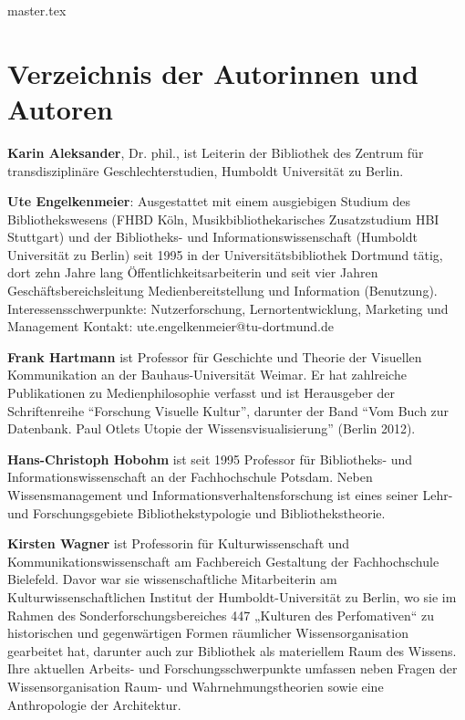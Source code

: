 \documentclass[10.5pt,a5paper,twoside]{memoir}
\begin{document}
\vspace{5mm}

{master.tex}


\chapter*[Verzeichnis der Autorinnen und Autoren]{Verzeichnis der Autorinnen und Autoren}

\noindent \textbf{Karin Aleksander}, Dr. phil., ist Leiterin der Bibliothek des Zentrum für transdisziplinäre Geschlechterstudien, Humboldt Universität zu Berlin.

\vspace{5mm}

\noindent \textbf{Ute Engelkenmeier}: Ausgestattet mit einem ausgiebigen Studium des
Bibliothekswesens (FHBD Köln, Musikbibliothekarisches Zusatzstudium HBI
Stuttgart) und der Bibliotheks- und Informationswissenschaft (Humboldt
Universität zu Berlin) seit 1995 in der Universitätsbibliothek Dortmund
tätig, dort zehn Jahre lang Öffentlichkeitsarbeiterin und seit vier
Jahren Geschäftsbereichsleitung Medienbereitstellung und Information
(Benutzung).
Interessensschwerpunkte: Nutzerforschung, Lernortentwicklung, Marketing
und Management
Kontakt: ute.engelkenmeier@tu-dortmund.de

\vspace{5mm}

\noindent \textbf{Frank Hartmann} ist Professor für Geschichte und Theorie der Visuellen Kommunikation an der Bauhaus-Universität Weimar. Er hat zahlreiche Publikationen zu Medienphilosophie verfasst und ist Herausgeber der Schriftenreihe \enquote{Forschung Visuelle Kultur}, darunter der Band \enquote{Vom Buch zur Datenbank. Paul Otlets Utopie der Wissensvisualisierung} (Berlin 2012).

\vspace{5mm}

\noindent \textbf{Hans-Christoph Hobohm} ist seit 1995 Professor für Biblio\-theks- und Informationswissenschaft an der Fachhochschule Potsdam. Neben Wissensmanagement und Informationsverhaltensforschung ist eines seiner Lehr- und Forschungsgebiete Bibliothekstypologie und Bibliothekstheorie.

\vspace{5mm}

\noindent \textbf{Kirsten Wagner} ist Professorin für Kulturwissenschaft und
Kommunikationswissenschaft am Fachbereich Gestaltung der Fachhochschule
Bielefeld. Davor war sie wissenschaftliche Mitarbeiterin am
Kulturwissenschaftlichen Institut der Humboldt-Universität zu Berlin, wo
sie im Rahmen des Sonderforschungsbereiches 447 „Kulturen des
Perfomativen“ zu historischen und gegenwärtigen Formen räumlicher
Wissensorganisation gearbeitet hat, darunter auch zur Bibliothek als
materiellem Raum des Wissens. Ihre aktuellen Arbeits- und
Forschungsschwerpunkte umfassen neben Fragen der Wissensorganisation
Raum- und Wahrnehmungstheorien sowie eine Anthropologie der Architektur.

\cleartoverso

\cleartorecto
\end{document}
